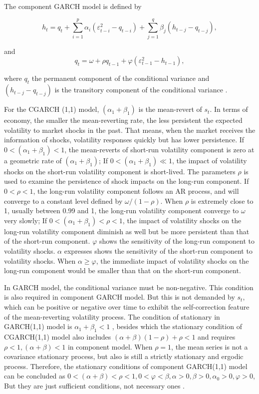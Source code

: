 The component GARCH model is defined by

\begin{equation}
h_{t}=q_{t}+\sum_{i=1}^{p}\alpha_{i}(\varepsilon_{t-i}^{2}-q_{t-i}) + \sum_{j=1}^{q}\beta_{j}(h_{t-j}-q_{t-j}),
\end{equation}

and
\begin{equation}
q_{t} = \omega + \rho q_{t-1}  +\varphi(\varepsilon_{t-1}^{2}-h_{t-1}),
\end{equation}

where $q_{t}$ the permanent component of the conditional variance and $(h_{t-j}-q_{t-j})$ is the transitory component of the conditional variance \citep{0-19-829683-5,Ghalanos2011}. 

For the CGARCH (1,1) model, $(\alpha_1 +  \beta_1)$ is the mean-revert of $s_{t}$. In terms of economy, the smaller the mean-reverting rate, the less persistent the expected volatility to market shocks in the past. That means, when the market receives the information of shocks, volatility responses quickly but has lower persistence. If $0<(\alpha_1 +  \beta_1)<1$, the mean-reverts of short-run volatility component is zero at a geometric rate of  $(\alpha_1 +  \beta_1)$;  If $0<(\alpha_1 +  \beta_1)\ll1$, the impact of volatility shocks on the short-run volatility component is short-lived. The parameters $\rho$  is used to examine the persistence of shock impacts on the long-run component. If $0<\rho<1$,  the long-run volatility component follows an AR process, and will converge to a constant level defined by $\omega/(1-\rho)$. When  $\rho$ is extremely close to 1, usually between 0.99 and 1, the long-run volatility component converge to $\omega$ very slowly; If $0<(\alpha_1 +  \beta_1)<\rho<1$, the impact of volatility shocks on the long-run volatility component diminish as well but be more persistent than that of the short-run component. $\varphi$ shows the sensitivity of the  long-run component to volatility shocks. $\alpha$ expresses shows the sensitivity of the  short-run component to volatility shocks. When $\alpha\geq\varphi$, the immediate impact of volatility shocks on the long-run component would be smaller than that on the short-run component.

In GARCH model, the conditional variance must be non-negative. This condition is also required in component GARCH model. But this is not demanded by $s_{t}$, which can be positive or negative over time to exhibit the self-correction feature of the mean-reverting volatility process. The condition of stationary in GARCH(1,1) model is  $\alpha_{1} + \beta_{1}<1$ , besides which the stationary condition of CGARCH(1,1) model also includes $(\alpha + \beta)(1-\rho)+\rho<1$ and requires $\rho<1,(\alpha + \beta)<1$ in component model. When $\rho=1$, the mean series is not a covariance stationary process, but also is still a strictly stationary and ergodic process. Therefore, the stationary conditions of component GARCH(1,1) model can be concluded as $0<(\alpha + \beta)< \rho<1, 0<\varphi<\beta,\alpha>0,\beta>0,\alpha_{0}>0,\varphi>0$, But they are just sufficient conditions, not necessary ones \citep{0-19-829683-5}.